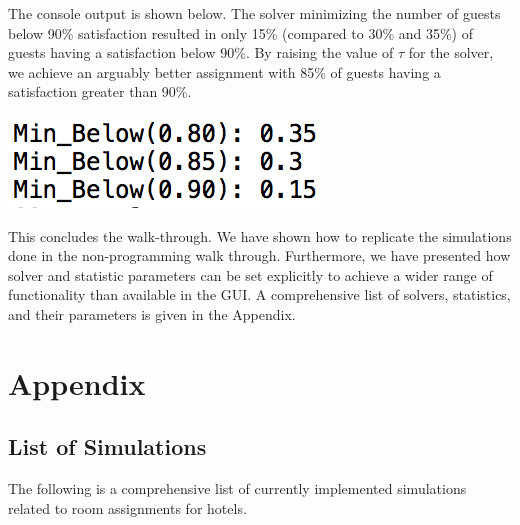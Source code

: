 \documentclass[11 pt]{article}
\begin{document}
The console output is shown below. The solver minimizing the number of guests below 90\% satisfaction resulted in only 15\% (compared to 30\% and 35\%) of guests having a satisfaction below 90\%. By raising the value of $\tau$ for the solver, we achieve an arguably better assignment with 85\% of guests having a satisfaction greater than 90\%. 
\begin{center}
\includegraphics[scale=0.7]{images/results.png}
\end{center}
\par This concludes the walk-through. We have shown how to replicate the simulations done in the non-programming walk through. Furthermore, we have presented how solver and statistic parameters can be set explicitly to achieve a wider range of functionality than available in the GUI. A comprehensive list of solvers, statistics, and their parameters is given in the Appendix.

\newpage

\appendix
\section{Appendix}


\subsection{List of Simulations}

\par The following is a comprehensive list of currently implemented simulations related to room assignments for hotels. 
\end{document}
